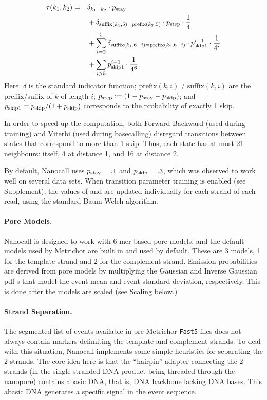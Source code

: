 \documentclass{bioinfo}
\begin{document}
\begin{methods}
\begin{align*}
\tau(k_1, k_2) = \quad &
\delta_{k_1 = k_2} \cdot p_\mathrm{stay}
\\
& + \delta_{\mathrm{suffix}(k_1, 5) = \mathrm{prefix}(k_2, 5)} \cdot p_\mathrm{step} \cdot \frac{1}{4}
\\
& + \sum_{i=2}^5 \delta_{\mathrm{suffix}(k_1, 6-i) = \mathrm{prefix}(k_2, 6-i)} \cdot p_\mathrm{skip1}^{i-1} \cdot \frac{1}{4^i}
\\
& + \sum_{i>5} p_\mathrm{skip1}^{i-1} \cdot \frac{1}{4^6}.
\end{align*}
Here: $\delta$ is the standard indicator function; $\mathrm{prefix}(k,i)$ / $\mathrm{suffix}(k,i)$ are the preffix/suffix of $k$ of length $i$; $p_\mathrm{step} := (1 - p_\mathrm{stay} - p_\mathrm{skip})$; and $p_\mathrm{skip1} = p_\mathrm{skip} / (1 + p_\mathrm{skip})$ corresponds to the probability of exactly 1 skip.

In order to speed up the computation, both Forward-Backward (used during training) and Viterbi (used during basecalling) disregard transitions between states that correspond to more than 1 skip. Thus, each state has at most 21 neighbours: itself, 4 at distance 1, and 16 at distance 2.

By default, Nanocall uses $p_\mathrm{stay} = .1$ and $p_\mathrm{skip} = .3$, which was observed to work well on several data sets. When transition parameter training is enabled (see Supplement), the values of \pstay and \pskip are updated individually for each strand of each read, using the standard Baum-Welch algorithm.

\paragraph{Pore Models.}
Nanocall is designed to work with 6-mer based pore models, and the default models used by Metrichor are built in and used by default. These are 3 models, 1 for the template strand and 2 for the complement strand. Emission probabilities are derived from pore models by multiplying the Gaussian and Inverse Gaussian pdf-s that model the event mean and event standard deviation, respectively. This is done after the models are scaled (see Scaling below.)

\paragraph{Strand Separation.}
The segmented list of events available in pre-Metrichor \texttt{Fast5} files does not always contain markers delimiting the template and complement strands. To deal with this situation, Nanocall implements some simple heuristics for separating the 2 strands. The core idea here is that the ``hairpin'' adapter connecting the 2 strands (in the single-stranded DNA product being threaded through the nanopore) contains abasic DNA, that is, DNA backbone lacking DNA bases. This abasic DNA generates a specific signal in the event sequence.


\end{methods}
\end{document}
